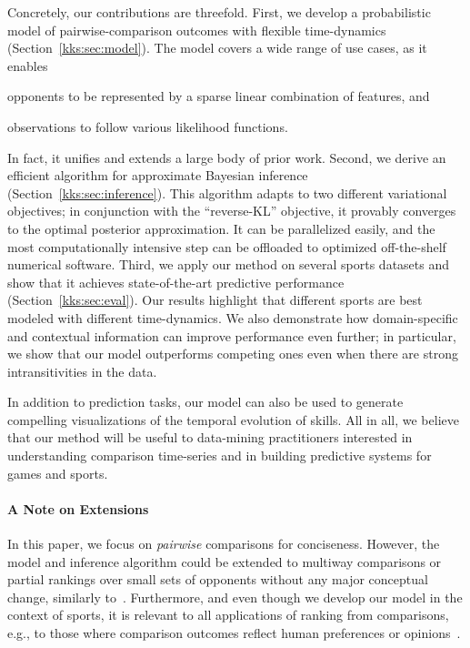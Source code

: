 Concretely, our contributions are threefold.
First, we develop a probabilistic model of pairwise-comparison outcomes with flexible time-dynamics (Section~\ref{kks:sec:model}).
The model covers a wide range of use cases, as it enables
\begin{enuminline}
\item opponents to be represented by a sparse linear combination of features, and
\item observations to follow various likelihood functions.
\end{enuminline}
In fact, it unifies and extends a large body of prior work.
Second, we derive an efficient algorithm for approximate Bayesian inference (Section~\ref{kks:sec:inference}).
This algorithm adapts to two different variational objectives;
in conjunction with the ``reverse-KL'' objective, it provably converges to the optimal posterior approximation.
It can be parallelized easily, and the most computationally intensive step can be offloaded to optimized off-the-shelf numerical software.
Third, we apply our method on several sports datasets and show that it achieves state-of-the-art predictive performance (Section~\ref{kks:sec:eval}).
Our results highlight that different sports are best modeled with different time-dynamics.
We also demonstrate how domain-specific and contextual information can improve performance even further;
in particular, we show that our model outperforms competing ones even when there are strong intransitivities in the data.

In addition to prediction tasks, our model can also be used to generate compelling visualizations of the temporal evolution of skills.
All in all, we believe that our method will be useful to data-mining practitioners interested in understanding comparison time-series and in building predictive systems for games and sports.

\paragraph{A Note on Extensions}
In this paper, we focus on \emph{pairwise} comparisons for conciseness.
However, the model and inference algorithm could be extended to multiway comparisons or partial rankings over small sets of opponents without any major conceptual change, similarly to~\citet{herbrich2006trueskill}.
Furthermore, and even though we develop our model in the context of sports, it is relevant to all applications of ranking from comparisons, e.g., to those where comparison outcomes reflect human preferences or opinions~\citep{thurstone1927law, mcfadden1973conditional, salganik2015wiki}.

